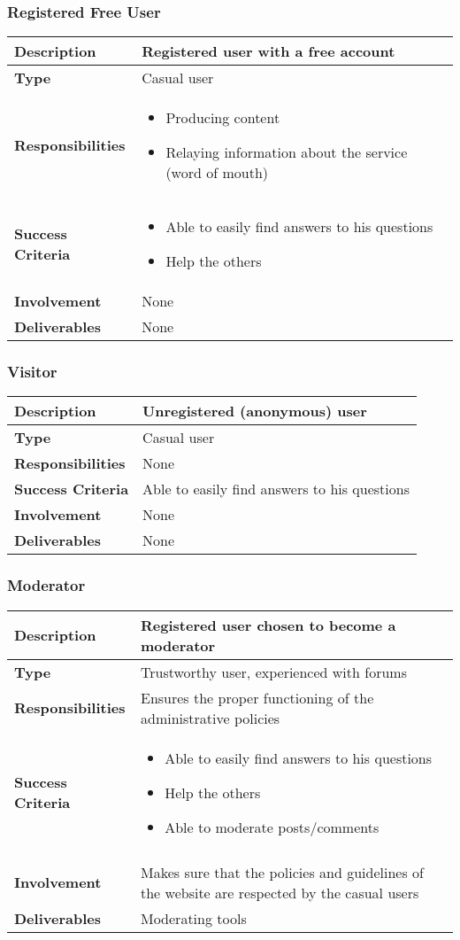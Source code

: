 \documentclass [a4paper, 12pt] {article}
\begin{document}
\subsubsection{Registered Free User}
\begin{tabular}{| >{\bfseries} M{4cm} | M{10cm} |}
	\hline
	Description & Registered user with a free account \tabularnewline
	\hline
	Type & Casual user \tabularnewline
	\hline
	Responsibilities &
	\begin{itemize}
		\item Producing content
		\item Relaying information about the service (word of mouth)
	\end{itemize} \tabularnewline
	\hline
	Success Criteria &
	\begin{itemize}
		\item Able to easily find answers to his questions
		\item Help the others
	\end{itemize} \tabularnewline
	\hline
	Involvement & None \tabularnewline
	\hline
	Deliverables & None \tabularnewline
	\hline
\end{tabular}

\subsubsection{Visitor}
\begin{tabular}{| >{\bfseries} M{4cm} | M{10cm} |}
	\hline
	Description & Unregistered (anonymous) user \tabularnewline
	\hline
	Type & Casual user \tabularnewline
	\hline
	Responsibilities & None \tabularnewline
	\hline
	Success Criteria & Able to easily find answers to his questions \tabularnewline
	\hline
	Involvement & None \tabularnewline
	\hline
	Deliverables & None \tabularnewline
	\hline
\end{tabular}

\subsubsection{Moderator}
\begin{tabular}{| >{\bfseries} M{4cm} | M{10cm} |}
	\hline
	Description & Registered user chosen to become a moderator \tabularnewline
	\hline
	Type & Trustworthy user, experienced with forums \tabularnewline
	\hline
	Responsibilities & Ensures the proper functioning of the administrative policies \tabularnewline
	\hline
	Success Criteria &
	\begin{itemize}
		\item Able to easily find answers to his questions
		\item Help the others
		\item Able to moderate posts/comments
	\end{itemize} \tabularnewline
 \tabularnewline
	\hline
	Involvement & Makes sure that the policies and guidelines of the website are respected by the casual users \tabularnewline
	\hline
	Deliverables & Moderating tools \tabularnewline
	\hline
\end{tabular}
\end{document}
